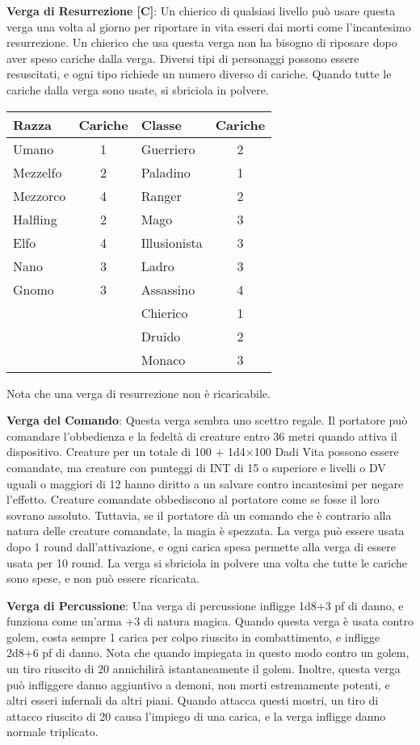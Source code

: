 \documentclass{article}
\begin{document}
\begin{multicols}{2}
\textbf{Verga di Resurrezione [C]}: Un chierico di qualsiasi livello può usare questa verga una volta al giorno per riportare in vita esseri dai morti come l'incantesimo resurrezione. Un chierico che usa questa verga non ha bisogno di riposare dopo aver speso cariche dalla verga. Diversi tipi di personaggi possono essere resuscitati, e ogni tipo richiede un numero diverso di cariche. Quando tutte le cariche dalla verga sono usate, si sbriciola in polvere.

\begin{table}[h]
\centering
\begin{tabular}{|l|c|l|c|}
\hline
\textbf{Razza} & \textbf{Cariche} & \textbf{Classe} & \textbf{Cariche} \\
\hline
Umano & 1 & Guerriero & 2 \\
Mezzelfo & 2 & Paladino & 1 \\
Mezzorco & 4 & Ranger & 2 \\
Halfling & 2 & Mago & 3 \\
Elfo & 4 & Illusionista & 3 \\
Nano & 3 & Ladro & 3 \\
Gnomo & 3 & Assassino & 4 \\
& & Chierico & 1 \\
& & Druido & 2 \\
& & Monaco & 3 \\
\hline
\end{tabular}

\end{table}

Nota che una verga di resurrezione non è ricaricabile.

\textbf{Verga del Comando}: Questa verga sembra uno scettro regale. Il portatore può comandare l'obbedienza e la fedeltà di creature entro 36 metri quando attiva il dispositivo. Creature per un totale di 100 + 1d4×100 Dadi Vita possono essere comandate, ma creature con punteggi di INT di 15 o superiore e livelli o DV uguali o maggiori di 12 hanno diritto a un salvare contro incantesimi per negare l'effetto. Creature comandate obbediscono al portatore come se fosse il loro sovrano assoluto. Tuttavia, se il portatore dà un comando che è contrario alla natura delle creature comandate, la magia è spezzata. La verga può essere usata dopo 1 round dall'attivazione, e ogni carica spesa permette alla verga di essere usata per 10 round. La verga si sbriciola in polvere una volta che tutte le cariche sono spese, e non può essere ricaricata.

\textbf{Verga di Percussione}: Una verga di percussione infligge 1d8+3 pf di danno, e funziona come un'arma +3 di natura magica. Quando questa verga è usata contro golem, costa sempre 1 carica per colpo riuscito in combattimento, e infligge 2d8+6 pf di danno. Nota che quando impiegata in questo modo contro un golem, un tiro riuscito di 20 annichilirà istantaneamente il golem. Inoltre, questa verga può infliggere danno aggiuntivo a demoni, non morti estremamente potenti, e altri esseri infernali da altri piani. Quando attacca questi mostri, un tiro di attacco riuscito di 20 causa l'impiego di una carica, e la verga infligge danno normale triplicato.



\end{multicols}
\end{document}
